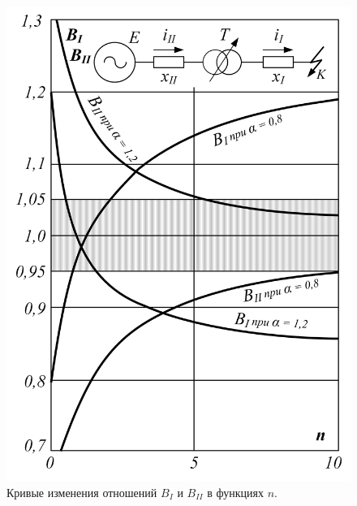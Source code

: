 \begin{figure} %
	\centering
	\includegraphics[width=0.95\linewidth]{pic/2-2}
	\caption{Кривые изменения отношений $ B_I $ и $ B_{II} $ в функциях $ n $.}
	\label{fig:2-2 B_I and B_I}
\end{figure}

